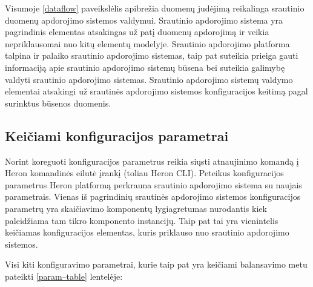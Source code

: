 \documentclass{VUMIFPSbakalaurinis}
\begin{document}
Visumoje \ref{dataflow} paveikslėlis apibrežia duomenų judėjimą reikalinga srautinio duomenų apdorojimo sistemos valdymui. Srautinio apdorojimo sistema yra pagrindinis elementas atsakingas už patį duomenų apdorojimą ir veikia nepriklausomai nuo kitų elementų modelyje. Srautinio apdorojimo platforma talpina ir palaiko srautinio apdorojimo sistemas, taip pat suteikia prieiga gauti informaciją apie srautinio apdorojimo sistemų būsena bei suteikia galimybę valdyti srautinio apdorojimo sistemas. Srautinio apdorojimo sistemų valdymo elementai atsakingi už srautinės apdorojimo sistemos konfiguracijos keitimą pagal surinktus būsenos duomenis.

\subsection{Keičiami konfiguracijos parametrai}

Norint koreguoti konfiguracijos parametrus reikia siųsti atnaujinimo komandą į Heron komandinės eilutė įrankį (toliau Heron CLI). Peteikus konfiguracijos parametrus Heron platformą perkrauna srautinio apdorojimo sistema su naujais parametrais. 
Vienas iš pagrindinių srautinės apdorojimo sistemos konfiguracijos parametrų yra skaičiavimo komponentų lygiagretumas nurodantis kiek paleidžiama tam tikro komponento instancijų. Taip pat tai yra vienintelis keičiamas konfiguracijos elementas, kuris priklauso nuo srautinio apdorojimo sistemos.

Visi kiti konfiguravimo parametrai\cite{configDocument},  kurie taip pat yra keičiami balansavimo metu pateikti \ref{param–table} lentelėje:
\end{document}
